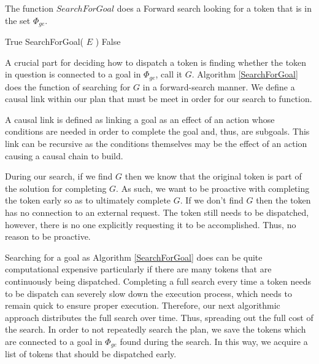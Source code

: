 \begin{algorithm}
\caption{The function $SearchForGoal$ does a Forward search looking for a token that is
in the set $\Phi_{ge}$.}
\label{SearchForGoal}
\begin{algorithmic}
			\State \Return True
			\State \Return SearchForGoal( $E$ )
		\Else 
			\State \Return False
		\EndIf
	\EndFor
\EndFor
\EndFunction
\end{algorithmic}
\end{algorithm}

A crucial part for deciding how to dispatch a token is finding whether the token in question is 
connected to a goal in $\Phi_{ge}$, call it $G$. Algorithm \ref{SearchForGoal} does the function of 
searching for $G$ in a forward-search manner. We define a causal link within our plan that must be
meet in order for our search to function. 
\begin{definition}
\label{def:subgoalLink}
A causal link is defined as linking a goal as an effect of an action whose conditions are needed in order
to complete the goal and, thus, are subgoals. This link can be recursive as the conditions themselves 
may be the effect of an action causing a causal chain to build.
\end{definition}
During our search, if we find $G$ then we know that the original token is part of the solution for completing $G$. 
As such, we want to be proactive with completing the token early so as to ultimately complete $G$. If we don't 
find $G$ then the token has no connection to an external request. The token still needs to be dispatched, 
however, there is no one explicitly requesting it to be accomplished. Thus, no reason to be proactive. 

Searching for a goal as Algorithm \ref{SearchForGoal} does can be quite computational expensive particularly if
there are many tokens that are continuously being dispatched. Completing a full search every time a token 
needs to be dispatch can severely slow down the execution process, which needs to remain quick to ensure 
proper execution. Therefore, our next algorithmic approach distributes the full search over time. 
Thus, spreading out the full cost of the search. In order to not repeatedly search the plan, we save the tokens 
which are connected to a goal in $\Phi_{ge}$ found during the search. In this way, we acquire a list of tokens 
that should be dispatched early. 

